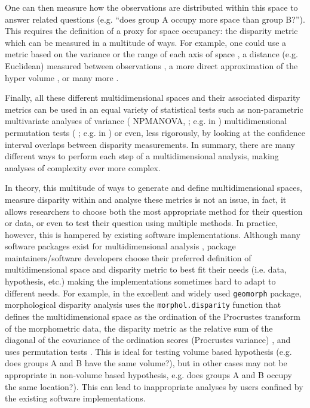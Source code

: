 \documentclass[12pt,letterpaper]{article}
\begin{document}
One can then measure how the observations are distributed within this space to answer related questions (e.g. ``does group A occupy more space than group B?'').
This requires the definition of a proxy for space occupancy: the disparity metric \citep[or index;][]{Hopkins2017} which can be measured in a multitude of ways.
For example, one could use a metric based on the variance or the range of each axis of space \citep{Wills2001, Ciampaglio2001}, a distance (e.g. Euclidean) measured between observations \citep{foote1993contributions,Foote29111996}, a more direct approximation of the hyper volume \citep{cornwell2006trait,DonohueDim}, or many more \citep[e.g.][]{navarro2003MDA}.

Finally, all these different multidimensional spaces and their associated disparity metrics can be used in an equal variety of statistical tests such as non-parametric multivariate analyses of variance (
NPMANOVA, \citealt{NPMANOVA}; e.g. in \citealt{Brusatte12092008}) multidimensional permutation tests ( \citealt{ManlyPermutations}; e.g. in \citealt{diaz2016global}) or even, less rigorously, by looking at the confidence interval overlaps between disparity measurements.
In summary, there are many different ways to perform each step of a multidimensional analysis, making analyses of complexity ever more complex.

In theory, this multitude of ways to generate and define multidimensional spaces, measure disparity within and analyse these metrics is not an issue, in fact, it allows researchers to choose both the most appropriate method for their question or data, or even to test their question using multiple methods.
In practice, however, this is hampered by existing software implementations.
Although many software packages exist for multidimensional analysis \citep[e.g.][]{navarro2003MDA,bouxin2005ginkgo,de2007ginkgo,oksanen2007vegan,geiger2008,adams2013geomorph,Claddis,adams2017geometric},
package maintainers/software developers choose their preferred definition of multidimensional space and disparity metric to best fit their needs (i.e. data, hypothesis, etc.) making the implementations sometimes hard to adapt to different needs.
For example, in the excellent and widely used \texttt{geomorph} package, morphological disparity analysis uses the \texttt{morphol.disparity} function that defines the multidimensional space as the ordination of the Procrustes transform of the morphometric data, the disparity metric
as the relative sum of the diagonal of the covariance of the ordination scores (Procrustes variance)
, and uses permutation tests \citep{zelditch2012geometric,adams2013geomorph,adams2017geometric}.
This is ideal for testing volume based hypothesis (e.g. does groups A and B have the same volume?), but in other cases may not be appropriate in non-volume based hypothesis, e.g. does groups A and B occupy the same location?).
This can lead to inappropriate analyses by users confined by the existing software implementations.
\end{document}
